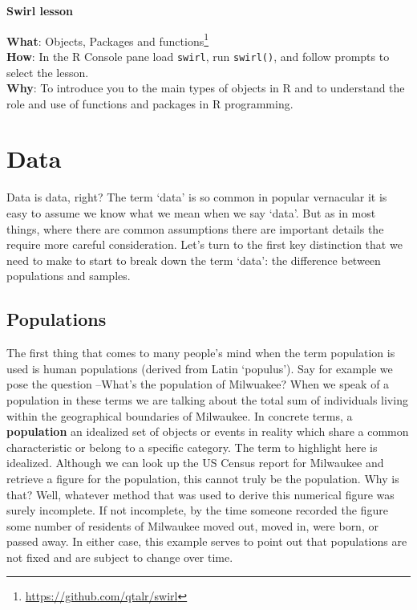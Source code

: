 \documentclass[
  letterpaper,
]{latex/krantz}
\DeclareRobustCommand{\href}[2]{#2\footnote{\url{#1}}}
\begin{document}
\begin{tcolorbox}[enhanced jigsaw, left=2mm, arc=.35mm, colback=white, rightrule=.15mm, toprule=.15mm, breakable, leftrule=.75mm, opacityback=0, bottomrule=.15mm]

\textbf{ Swirl lesson}

\textbf{What}: \href{https://github.com/qtalr/swirl}{Objects, Packages
and functions}\\
\textbf{How}: In the R Console pane load \texttt{swirl}, run
\texttt{swirl()}, and follow prompts to select the lesson.\\
\textbf{Why}: To introduce you to the main types of objects in R and to
understand the role and use of functions and packages in R programming.

\end{tcolorbox}

\hypertarget{data}{%
\section{Data}\label{data}}

Data is data, right? The term `data' is so common in popular vernacular
it is easy to assume we know what we mean when we say `data'. But as in
most things, where there are common assumptions there are important
details the require more careful consideration. Let's turn to the first
key distinction that we need to make to start to break down the term
`data': the difference between populations and samples.

\hypertarget{populations}{%
\subsection{Populations}\label{populations}}

The first thing that comes to many people's mind when the term
population is used is human populations (derived from Latin `populus').
Say for example we pose the question --What's the population of
Milwuakee? When we speak of a population in these terms we are talking
about the total sum of individuals living within the geographical
boundaries of Milwaukee. In concrete terms, a
\textbf{population} an idealized set of objects or
events in reality which share a common characteristic or belong to a
specific category. The term to highlight here is idealized. Although we
can look up the US Census report for Milwaukee and retrieve a figure for
the population, this cannot truly be the population. Why is that? Well,
whatever method that was used to derive this numerical figure was surely
incomplete. If not incomplete, by the time someone recorded the figure
some number of residents of Milwaukee moved out, moved in, were born, or
passed away. In either case, this example serves to point out that
populations are not fixed and are subject to change over time.
\end{document}
